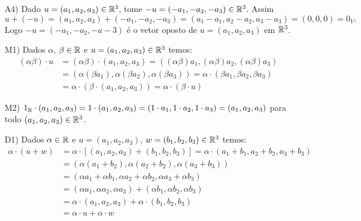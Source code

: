 \begin{exemplo}
\begin{enumerate}[label={\arabic*})]
\begin{solucao}
\begin{enumerate}
              \item[A4)] Dado $u = (a_1, a_2, a_3) \in \mathbb{R}^3$, tome $-u = (-a_1, -a_2, -a_3) \in \mathbb{R}^3$. Assim
                \[
                  u + (-u) = (a_1, a_2, a_3) + (-a_1, -a_2, -a_3) = (a_1 - a_1, a_2 - a_2, a_3 - a_3) = (0, 0, 0) = 0_V.
                \]
                Logo $-u = (-a_1, -a_2, -a-3)$ é o vetor oposto de $u = (a_1, a_2, a_3)$ em $\mathbb{R}^3$.

              \item[M1)] Dados $\alpha$, $\beta \in \mathbb{R}$ e $u = (a_1, a_2, a_3) \in \mathbb{R}^3$ temos:
                \begin{align*}
                  (\alpha\beta)\cdot u & = (\alpha \beta)\cdot (a_1, a_2, a_3) = ((\alpha\beta)a_1, (\alpha\beta)a_2, (\alpha\beta)a_3) \\ &= (\alpha(\beta a_1), \alpha(\beta a_2), \alpha(\beta a_3)) = \alpha\cdot(\beta a_1, \beta a_2, \beta a_3)\\ & = \alpha\cdot(\beta\cdot(a_1, a_2, a_3)) = \alpha\cdot(\beta\cdot u)
                \end{align*}

              \item[M2)] $1_{\mathbb{R}} \cdot (a_1, a_2, a_3) = 1 \cdot (a_1, a_2, a_3) = (1\cdot a_1, 1\cdot a_2, 1\cdot a_3) = (a_1, a_2, a_3)$ para todo $(a_1, a_2, a_3) \in \mathbb{R}^3$.

              \item[D1)] Dados $\alpha \in \mathbb{R}$ e $u = (a_1, a_2, a_3)$, $w = (b_1, b_2, b_3) \in \mathbb{R}^3$ temos:
                \begin{align*}
                  \alpha\cdot(u + w) & = \alpha\cdot[(a_1, a_2, a_3) + (b_1, b_2, b_3)] = \alpha\cdot(a_1 + b_1, a_2 + b_2, a_3 + b_3) \\ &= (\alpha(a_1 + b_2), \alpha(a_2 + b_2), \alpha(a_3 + b_3))\\ &= (\alpha a_1 + \alpha b_1, \alpha a_2 + \alpha b_2, \alpha a_3 + \alpha b_3) \\ &= (\alpha a_1, \alpha a_2, \alpha a_3) + (\alpha b_1, \alpha b_2, \alpha b_3)\\ &= \alpha\cdot(a_1, a_2, a_3) + \alpha\cdot(b_1, b_2, b_3) \\ &= \alpha\cdot u + \alpha\cdot w
                \end{align*}


\end{enumerate}
\end{solucao}
\end{enumerate}
\end{exemplo}
